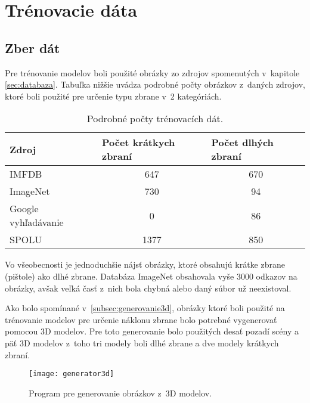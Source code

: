 
\section{Trénovacie dáta}
\label{sec:trenovaciedata}

\subsection{Zber dát}
Pre trénovanie modelov boli použité obrázky zo zdrojov spomenutých v~kapitole \ref{sec:databaza}.
Tabuľka nižšie uvádza podrobné počty obrázkov z~daných zdrojov, ktoré boli použité pre určenie typu zbrane v~2 kategóriách.

\begin{table}[H]
  \centering
  \label{my-label}
  \begin{tabular}{|l|c|c|}
    \hline
    Zdroj               & \multicolumn{1}{l|}{Počet krátkych zbraní} & \multicolumn{1}{l|}{Počet dlhých zbraní} \\ \hline
    IMFDB               & 647                                        & 670                                      \\ \hline
    ImageNet            & 730                                        & 94                                       \\ \hline
    Google vyhľadávanie & 0                                          & 86                                       \\ \hline \hline
    SPOLU               & 1377                                       & 850                                      \\ \hline
  \end{tabular}
  \caption{Podrobné počty trénovacích dát.}
\end{table}

Vo všeobecnosti je jednoduchšie nájsť obrázky, ktoré obsahujú krátke zbrane (pištole) ako dlhé zbrane.
Databáza ImageNet obsahovala vyše 3000 odkazov na obrázky, avšak veľká časť z~nich bola chybná alebo daný súbor už neexistoval.

Ako bolo spomínané v~\ref{subsec:generovanie3d}, obrázky ktoré boli použité na trénovanie modelov pre určenie náklonu zbrane bolo potrebné
    vygenerovať pomocou 3D modelov.
Pre toto generovanie bolo použitých desať pozadí scény a päť 3D modelov z~toho tri modely boli dlhé zbrane a dve modely krátkych zbraní.

\begin{figure}[H]
    \centering
    \texttt{[image: generator3d]}
    \caption{Program pre generovanie obrázkov z~3D modelov.}
    \label{pic:generator3d}
\end{figure}

